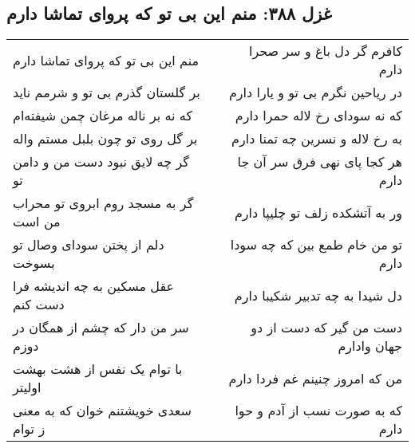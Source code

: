 \begin{center}
\section*{غزل ۳۸۸: منم این بی تو که پروای تماشا دارم}
\label{sec:388}
\begin{longtable}{l p{0.5cm} r}
منم این بی تو که پروای تماشا دارم
&&
کافرم گر دل باغ و سر صحرا دارم
\\
بر گلستان گذرم بی تو و شرمم ناید
&&
در ریاحین نگرم بی تو و یارا دارم
\\
که نه بر ناله مرغان چمن شیفته‌ام
&&
که نه سودای رخ لاله حمرا دارم
\\
بر گل روی تو چون بلبل مستم واله
&&
به رخ لاله و نسرین چه تمنا دارم
\\
گر چه لایق نبود دست من و دامن تو
&&
هر کجا پای نهی فرق سر آن جا دارم
\\
گر به مسجد روم ابروی تو محراب من است
&&
ور به آتشکده زلف تو چلیپا دارم
\\
دلم از پختن سودای وصال تو بسوخت
&&
تو من خام طمع بین که چه سودا دارم
\\
عقل مسکین به چه اندیشه فرا دست کنم
&&
دل شیدا به چه تدبیر شکیبا دارم
\\
سر من دار که چشم از همگان در دوزم
&&
دست من گیر که دست از دو جهان وادارم
\\
با توام یک نفس از هشت بهشت اولیتر
&&
من که امروز چنینم غم فردا دارم
\\
سعدی خویشتنم خوان که به معنی ز توام
&&
که به صورت نسب از آدم و حوا دارم
\\
\end{longtable}
\end{center}
